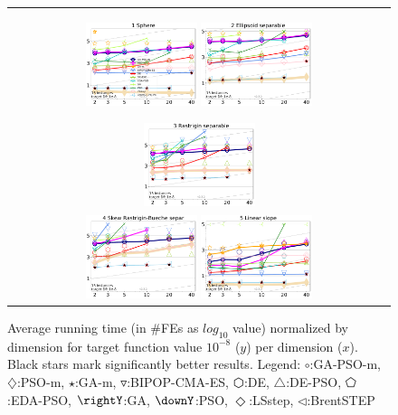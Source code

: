 \documentclass[runningheads]{llncs}
\begin{document}
\begin{figure}[h!tb]
  \begin{tabular}
      {c@{\hspace*{-0.00001\textwidth}}
      }
     
  \includegraphics[width=0.30\textwidth]{ppfigs_f001}
  \includegraphics[width=0.30\textwidth]{ppfigs_f002}

  \includegraphics[width=0.30\textwidth]{ppfigs_f003}\\
  \includegraphics[width=0.30\textwidth]{ppfigs_f004}
  
  \includegraphics[width=0.30\textwidth]{ppfigs_f005}
  \end{tabular}
  \vspace{-3ex}
   \caption{Average running time (in \#FEs as $log_{10}$ value)
     normalized by dimension for target function value $10^{-8}$ ($y$)
     per dimension ($x$). Black stars mark significantly better
     results.
    Legend: {\color{NavyBlue}$\circ$}:GA-PSO-m, 
    {\color{Magenta}$\diamondsuit$}:PSO-m, 
    {\color{Orange}$\star$}:GA-m, 
    {\color{CornflowerBlue}$\triangledown$}:BIPOP-CMA-ES,
    {\color{red}$\varhexagon$}:DE, 
    {\color{YellowGreen}$\triangle$}:DE-PSO, 
    {\color{cyan}$\pentagon$}:EDA-PSO, 
    {\color{GreenYellow}$\rightY$}:GA, 
    {\color{ForestGreen}$\downY$}:PSO, 
    {\color{Lavender}$\Diamond$}:LSstep, 
    {\color{SkyBlue}$\triangleleft$}:BrentSTEP
    } 
  \label{fig:avg}
\end{figure}
\end{document}
